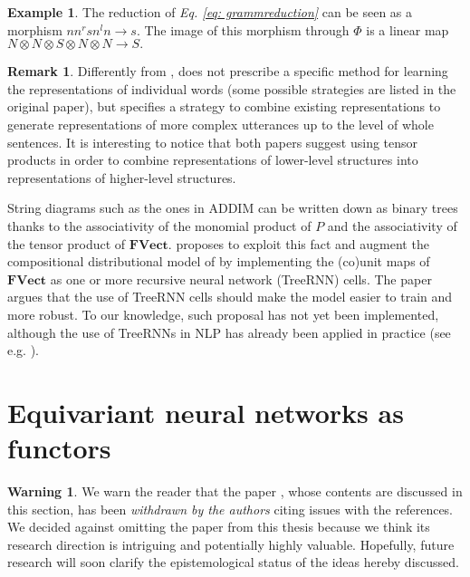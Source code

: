 \documentclass[11pt,a4paper,openright,twoside]{report}
\newcounter{mycounter}
\theoremstyle{plain}
\theoremstyle{definition}
\newtheorem{remark}[mycounter]{Remark}
\newtheorem{example}[mycounter]{Example}
\newtheorem{warning}[mycounter]{Warning}
\begin{document}
\begin{example}
  The reduction of \textit{Eq. \ref{eq: grammreduction}} can be seen as a morphism $nn^rsn^ln \to s$. The image of this morphism through $\Phi$ is a linear map 
  $N \otimes N \otimes S \otimes N \otimes N \to S.$
\end{example}

\begin{remark}
  Differently from \cite{sheshmani2021categorical}, \cite{coecke2010mathematical} does not prescribe a specific method for learning the representations of individual words (some possible strategies are listed in the original paper), but specifies a strategy to combine existing representations to generate representations of more complex utterances up to the level of whole sentences. It is interesting to notice that both papers suggest using tensor products in order to combine representations of lower-level structures into representations of higher-level structures.
\end{remark}


String diagrams such as the ones in ADDIM can be written down as binary trees thanks to the associativity of the monomial product of $P$ and the associativity of the tensor product of $\mathbf{FVect}$. 
\cite{lewis2019compositionality} proposes to exploit this fact and augment the compositional distributional model of \cite{coecke2010mathematical} by implementing the (co)unit maps of $\mathbf{FVect}$ as one or more recursive neural network (TreeRNN) cells. The paper argues that the use of TreeRNN cells should make the model easier to train and more robust. To our knowledge, such proposal has not yet been implemented, although the use of TreeRNNs in NLP has already been applied in practice (see e.g. \cite{ahmed2019improving}).





\section{Equivariant neural networks as functors}

\begin{warning}
  We warn the reader that the paper \cite{chytas2024poolingimagedatasetsmultiple}, whose contents are discussed in this section, has been \textit{withdrawn by the authors} citing issues with the references. We decided against omitting the paper from this thesis because we think its research direction is intriguing and potentially highly valuable. Hopefully, future research will soon clarify the epistemological status of the ideas hereby discussed.
\end{warning}
\end{document}
